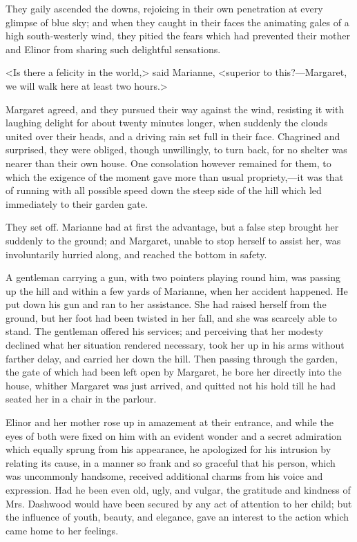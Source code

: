 They gaily ascended the downs, rejoicing in their own penetration at every glimpse of blue sky; and when they caught in their faces the animating gales of a high south-westerly wind, they pitied the fears which had prevented their mother and Elinor from sharing such delightful sensations.

<Is there a felicity in the world,> said Marianne, <superior to this?—Margaret, we will walk here at least two hours.>

Margaret agreed, and they pursued their way against the wind, resisting it with laughing delight for about twenty minutes longer, when suddenly the clouds united over their heads, and a driving rain set full in their face. Chagrined and surprised, they were obliged, though unwillingly, to turn back, for no shelter was nearer than their own house. One consolation however remained for them, to which the exigence of the moment gave more than usual propriety,—it was that of running with all possible speed down the steep side of the hill which led immediately to their garden gate.

They set off. Marianne had at first the advantage, but a false step brought her suddenly to the ground; and Margaret, unable to stop herself to assist her, was involuntarily hurried along, and reached the bottom in safety.

A gentleman carrying a gun, with two pointers playing round him, was passing up the hill and within a few yards of Marianne, when her accident happened. He put down his gun and ran to her assistance. She had raised herself from the ground, but her foot had been twisted in her fall, and she was scarcely able to stand. The gentleman offered his services; and perceiving that her modesty declined what her situation rendered necessary, took her up in his arms without farther delay, and carried her down the hill. Then passing through the garden, the gate of which had been left open by Margaret, he bore her directly into the house, whither Margaret was just arrived, and quitted not his hold till he had seated her in a chair in the parlour.

Elinor and her mother rose up in amazement at their entrance, and while the eyes of both were fixed on him with an evident wonder and a secret admiration which equally sprung from his appearance, he apologized for his intrusion by relating its cause, in a manner so frank and so graceful that his person, which was uncommonly handsome, received additional charms from his voice and expression. Had he been even old, ugly, and vulgar, the gratitude and kindness of Mrs. Dashwood would have been secured by any act of attention to her child; but the influence of youth, beauty, and elegance, gave an interest to the action which came home to her feelings.

